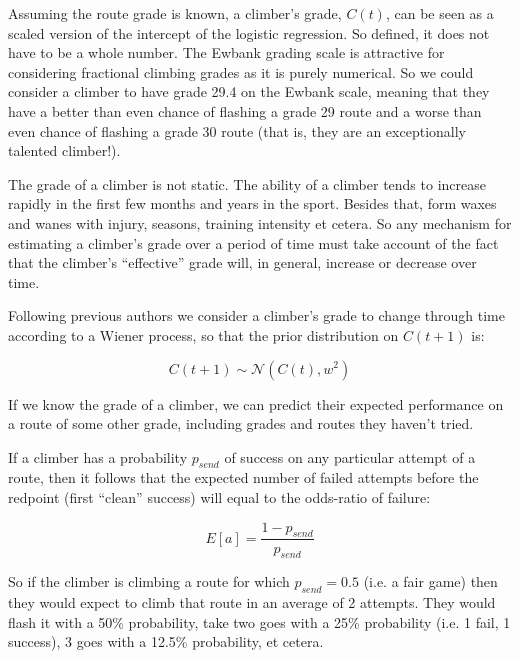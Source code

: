 \documentclass{article}
\begin{document}
Assuming the route grade is known, a climber's grade, $C(t)$, can be seen as a scaled version of the intercept of the logistic regression. So defined, it does not have to be a whole number. The Ewbank grading scale is attractive for considering fractional climbing grades as it is purely numerical. So we could consider a climber to have grade 29.4 on the Ewbank scale, meaning that they have a better than even chance of flashing a grade 29 route and a worse than even chance of flashing a grade 30 route (that is, they are an exceptionally talented climber!).

The grade of a climber is not static. The ability of a climber tends to increase rapidly in the first few months and years in the sport. Besides that, form waxes and wanes with injury, seasons, training intensity et cetera. So any mechanism for estimating a climber's grade over a period of time must take account of the fact that the climber's ``effective'' grade will, in general, increase or decrease over time.

Following previous authors  \cite{coulom2008whole,scarff2020estimation} we consider a climber's grade to change through time according to a Wiener process, so that the prior distribution on $C(t+1)$ is:

\begin{equation}
C(t+1) \sim \mathcal{N}(C(t), w^2)  
\end{equation}

If we know the grade of a climber, we can predict their expected performance on a route of some other grade, including grades and routes they haven't tried. 


If a climber has a probability $p_{send}$ of success on any particular attempt of a route, then it follows that the expected number of failed attempts before the redpoint (first ``clean'' success) will equal to the odds-ratio of failure:

\begin{equation}
 E\left[a\right]=\frac{1-p_{send}}{p_{send}}
 \end{equation} 
 
 So if the climber is climbing a route for which $p_{send}=0.5$ (i.e. a fair game) then they would expect to climb that route in an average of 2 attempts. They would flash it with a 50\% probability, take two goes with a 25\% probability (i.e. 1 fail, 1 success), 3 goes with a 12.5\% probability, et cetera.
\end{document}
